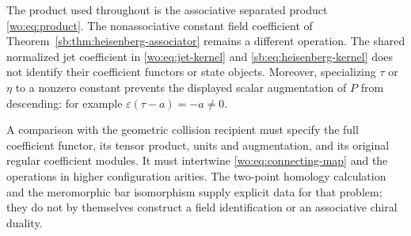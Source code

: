 The product used throughout is the associative separated product
\eqref{wo:eq:product}.  The nonassociative constant field coefficient
of Theorem~\ref{sb:thm:heisenberg-associator} remains a different
operation.  The shared normalized jet coefficient in
\eqref{wo:eq:jet-kernel} and \eqref{sb:eq:heisenberg-kernel}
does not identify their coefficient functors or state objects.
Moreover, specializing \(\tau\) or \(\eta\) to a nonzero
constant prevents the displayed scalar augmentation of \(P\)
from descending: for example \(\varepsilon(\tau-a)=-a\ne0\).

A comparison with the geometric collision recipient must specify
the full coefficient functor, its tensor product, units and
augmentation, and its original regular coefficient modules.  It
must intertwine \eqref{wo:eq:connecting-map} and the operations in
higher configuration arities.  The two-point homology calculation
and the meromorphic bar isomorphism supply explicit data for that
problem; they do not by themselves construct a field identification
or an associative chiral duality.
